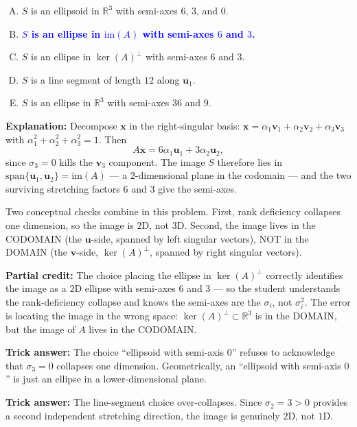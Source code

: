 \documentclass[12pt]{amsart}
\begin{document}
\begin{enumerate}[(A)]
\item $S$ is an ellipsoid in $\mathbb{R}^3$ with semi-axes $6$, $3$, and $0$.
\item \textcolor{blue}{\textbf{$S$ is an ellipse in $\mathrm{im}(A)$ with semi-axes $6$ and $3$.}}
\item $S$ is an ellipse in $\ker(A)^\perp$ with semi-axes $6$ and $3$.
\item $S$ is a line segment of length $12$ along $\mathbf{u}_1$.
\item $S$ is an ellipse in $\mathbb{R}^3$ with semi-axes $36$ and $9$.
\end{enumerate}

\textbf{Explanation:}
Decompose $\mathbf{x}$ in the right-singular basis:
$\mathbf{x} = \alpha_1\mathbf{v}_1 + \alpha_2\mathbf{v}_2 + \alpha_3\mathbf{v}_3$
with $\alpha_1^2 + \alpha_2^2 + \alpha_3^2 = 1$. Then
$$A\mathbf{x} = 6\alpha_1\mathbf{u}_1 + 3\alpha_2\mathbf{u}_2,$$
since $\sigma_3 = 0$ kills the $\mathbf{v}_3$ component.
The image $S$ therefore lies in
$\mathrm{span}\{\mathbf{u}_1, \mathbf{u}_2\} = \mathrm{im}(A)$ ---
a $2$-dimensional plane in the codomain ---
and the two surviving stretching factors $6$ and $3$
give the semi-axes.

Two conceptual checks combine in this problem.
First, rank deficiency collapses one dimension, so the image is $2$D, not $3$D.
Second, the image lives in the CODOMAIN (the $\mathbf{u}$-side, spanned by left
singular vectors), NOT in the DOMAIN (the $\mathbf{v}$-side, $\ker(A)^\perp$,
spanned by right singular vectors).

\textbf{Partial credit:}
The choice placing the ellipse in $\ker(A)^\perp$ correctly identifies the image
as a $2$D ellipse with semi-axes $6$ and $3$ --- so the student understands
the rank-deficiency collapse and knows the semi-axes are the $\sigma_i$, not
$\sigma_i^2$. The error is locating the image in the wrong space:
$\ker(A)^\perp \subset \mathbb{R}^3$ is in the DOMAIN, but the image of $A$
lives in the CODOMAIN.

\textbf{Trick answer:}
The choice ``ellipsoid with semi-axis $0$'' refuses to acknowledge that
$\sigma_3 = 0$ collapses one dimension. Geometrically, an ``ellipsoid with
semi-axis $0$'' is just an ellipse in a lower-dimensional plane.

\textbf{Trick answer:}
The line-segment choice over-collapses. Since $\sigma_2 = 3 > 0$ provides a
second independent stretching direction, the image is genuinely $2$D, not $1$D.
\end{document}
